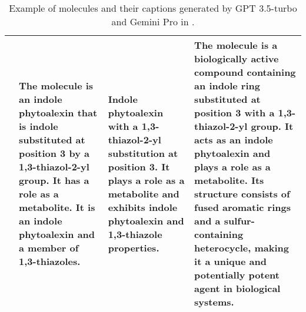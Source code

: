 \begin{table*}[!ht]
{\begin{tabular}{>{\arraybackslash}p{3cm} p{5cm} p{5cm} p{5cm}}
    \midrule
    \raisebox{-\totalheight}{\texttt{[image: pics/rewritting3.png]}} & \small The molecule is an indole phytoalexin that is indole substituted at position 3 by a 1,3-thiazol-2-yl group. It has a role as a metabolite. It is an indole phytoalexin and a member of 1,3-thiazoles. & \small Indole phytoalexin with a 1,3-thiazol-2-yl substitution at position 3. It plays a role as a metabolite and exhibits indole phytoalexin and 1,3-thiazole properties. & \small The molecule is a biologically active compound containing an indole ring substituted at position 3 with a 1,3-thiazol-2-yl group. It acts as an indole phytoalexin and plays a role as a metabolite. Its structure consists of fused aromatic rings and a sulfur-containing heterocycle, making it a unique and potentially potent agent in biological systems. \\ 
    \bottomrule
\end{tabular}
}
\caption{
Example of molecules and their captions generated by GPT 3.5-turbo and Gemini Pro in \newdataset.
}
\label{table:rewritten_captions}
\end{table*}
